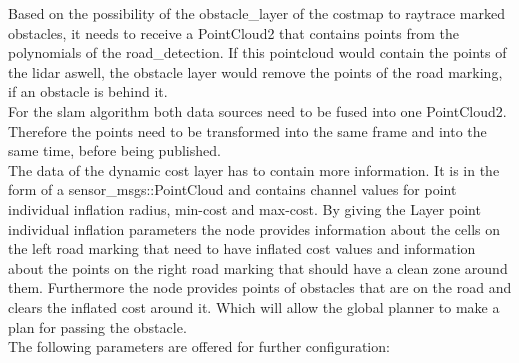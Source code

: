 Based on the possibility of the obstacle\_layer of the costmap to raytrace marked obstacles, it needs to receive a PointCloud2 that contains points from the polynomials of the road\_detection. If this pointcloud would contain the points of the lidar aswell, the obstacle layer would remove the points of the road marking, if an obstacle is behind it.\\

For the slam algorithm both data sources need to be fused into one PointCloud2. Therefore the points need to be transformed into the same frame and into the same time, before being published.\\

The data of the dynamic cost layer has to contain more information. It is in the form of a sensor\_msgs::PointCloud and contains channel values for point individual inflation radius, min-cost and max-cost. By giving the Layer point individual inflation parameters the node provides information about the cells on the left road marking that need to have inflated cost values and information about the points on the right road marking that should have a clean zone around them. Furthermore the node provides points of obstacles that are on the road and clears the inflated cost around it. Which will allow the global planner to make a plan for passing the obstacle.\\

The following parameters are offered for further configuration:

\begin{table}[H]
\centering
{}
\label{markfreespaceparams}
\caption{MarkeFreeSpace parameters}
\end{table}

